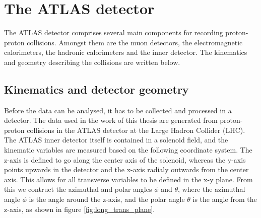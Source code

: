 \section{The ATLAS detector}
The ATLAS detector comprises several main components for recording proton-proton collisions. Amongst them are the muon detectors, 
the electromagnetic calorimeters, the hadronic calorimeters and the inner detector. The kinematics and geometry describing the collisions are 
written below.
\subsection*{Kinematics and detector geometry}
Before the data can be analysed, it has to be collected and processed in a detector. The data used in the work of this thesis 
are generated from proton-proton collisions in the ATLAS detector at the Large Hadron Collider (LHC). The ATLAS inner detector itself is contained in a solenoid field, 
and the kinematic variables are measured based on the following coordinate system. The z-axis is defined to go 
along the center axis of the solenoid, whereas the y-axis points upwards in the detector and the x-axis radialy 
outwards from the center axis. This allows for all transverse variables to be defined in the x-y plane\cite{Gramstad:1631043}. 
From this we contruct the azimuthal and polar angles $\phi$ and $\theta$, where the azimuthal angle $\phi$ is the angle around the z-axis, 
and the polar angle $\theta$ is the angle from the z-axis, as shown in figure \ref{fig:long_trans_plane}.


